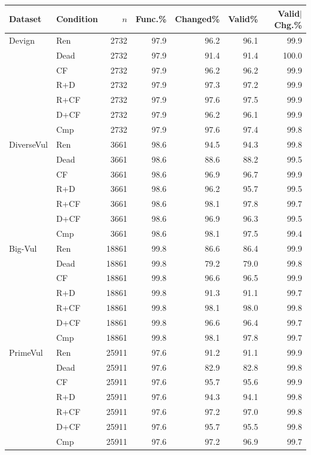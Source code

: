 \begin{tabular}{llrrrrr}
\toprule
Dataset & Condition & $n$ & Func.\% & Changed\% & Valid\% & Valid$\mid$Chg.\% \\
\midrule
Devign & Ren & 2732 & 97.9 & 96.2 & 96.1 & 99.9 \\
 & Dead & 2732 & 97.9 & 91.4 & 91.4 & 100.0 \\
 & CF & 2732 & 97.9 & 96.2 & 96.2 & 99.9 \\
 & R+D & 2732 & 97.9 & 97.3 & 97.2 & 99.9 \\
 & R+CF & 2732 & 97.9 & 97.6 & 97.5 & 99.9 \\
 & D+CF & 2732 & 97.9 & 96.2 & 96.1 & 99.9 \\
 & Cmp & 2732 & 97.9 & 97.6 & 97.4 & 99.8 \\
\midrule
DiverseVul & Ren & 3661 & 98.6 & 94.5 & 94.3 & 99.8 \\
 & Dead & 3661 & 98.6 & 88.6 & 88.2 & 99.5 \\
 & CF & 3661 & 98.6 & 96.9 & 96.7 & 99.9 \\
 & R+D & 3661 & 98.6 & 96.2 & 95.7 & 99.5 \\
 & R+CF & 3661 & 98.6 & 98.1 & 97.8 & 99.7 \\
 & D+CF & 3661 & 98.6 & 96.9 & 96.3 & 99.5 \\
 & Cmp & 3661 & 98.6 & 98.1 & 97.5 & 99.4 \\
\midrule
Big-Vul & Ren & 18861 & 99.8 & 86.6 & 86.4 & 99.9 \\
 & Dead & 18861 & 99.8 & 79.2 & 79.0 & 99.8 \\
 & CF & 18861 & 99.8 & 96.6 & 96.5 & 99.9 \\
 & R+D & 18861 & 99.8 & 91.3 & 91.1 & 99.7 \\
 & R+CF & 18861 & 99.8 & 98.1 & 98.0 & 99.8 \\
 & D+CF & 18861 & 99.8 & 96.6 & 96.4 & 99.7 \\
 & Cmp & 18861 & 99.8 & 98.1 & 97.8 & 99.7 \\
\midrule
PrimeVul & Ren & 25911 & 97.6 & 91.2 & 91.1 & 99.9 \\
 & Dead & 25911 & 97.6 & 82.9 & 82.8 & 99.8 \\
 & CF & 25911 & 97.6 & 95.7 & 95.6 & 99.9 \\
 & R+D & 25911 & 97.6 & 94.3 & 94.1 & 99.8 \\
 & R+CF & 25911 & 97.6 & 97.2 & 97.0 & 99.8 \\
 & D+CF & 25911 & 97.6 & 95.7 & 95.5 & 99.8 \\
 & Cmp & 25911 & 97.6 & 97.2 & 96.9 & 99.7 \\
\bottomrule
\end{tabular}
